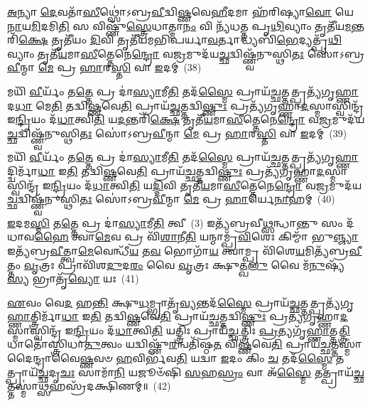 \-\ul{𑌅}\-𑌨𑍍𑌯𑌾 \ul{𑌦𑍇}\-𑌵𑌤𑌾᳴\-\ul{𑌸𑍀}\-𑌥𑍍𑌸𑍋॑\-𑌽𑌬𑍍𑌰\-\ul{𑌵𑍀}\-𑌦𑍍𑌵𑌿\-\ul{𑌷𑍍𑌣}\-𑌵𑍇\-\ul{𑌹𑍀}\-𑌦𑌮𑌾 𑌹᳴𑌰𑌿𑌷𑍍𑌯𑌾\-\ul{𑌵𑍋} 𑌯𑍇\-\ul{𑌨𑌾}\-𑌯\-\ul{𑌮𑌿}\-𑌦𑌮𑌿\-\ul{𑌤𑌿} 𑌸 𑌵𑌿𑌷𑍍𑌣𑍁᳴\-\ul{𑌸𑍍𑌤𑍍𑌰𑍇}\-𑌧𑌾𑌤𑍍𑌮𑌾\-\ul{𑌨𑌂} 𑌵𑌿 𑌨𑍍𑌯᳴𑌧𑌤𑍍𑌤 𑌪𑍃\-\ul{𑌥𑌿}\-𑌵𑍍𑌯𑌾𑌂 𑌤𑍃𑌤𑍀᳴𑌯\-\ul{𑌮}\-𑌨𑍍𑌤𑌰𑌿᳴\-\ul{𑌕𑍍𑌷𑍇} 𑌤𑍃𑌤𑍀᳴𑌯𑌂 \ul{𑌦𑌿}\-𑌵𑌿 𑌤𑍃𑌤𑍀᳴𑌯𑌮𑌭𑌿𑌪𑌰𑍍𑌯𑌾\-\ul{𑌵}\-𑌰𑍍𑌤𑌾𑌦𑍍𑌧𑍍𑌯𑌬𑌿᳴\-\ul{𑌭𑍇}\-𑌦𑍍𑌯𑌤𑍍𑌪𑍃᳴\-\ul{𑌥𑌿}\-𑌵𑍍𑌯𑌾𑌂 𑌤𑍃𑌤𑍀᳴\-\ul{𑌯}\-𑌮𑌾\-\ul{𑌸𑍀}\-𑌤𑍍𑌤𑍇𑌨𑍇\-\ul{𑌨𑍍𑌦𑍍𑌰𑍋} 𑌵\-\ul{𑌜𑍍𑌰}\-𑌮𑍁𑌦᳴𑌯\-\ul{𑌚𑍍𑌛}\-𑌦𑍍𑌵𑌿𑌷𑍍𑌣𑍍𑌵᳴𑌨𑍁𑌸𑍍𑌥𑌿\-\ul{𑌤𑌃} 𑌸𑍋॑\-𑌽𑌬𑍍𑌰\-\ul{𑌵𑍀}\-𑌨𑍍𑌮𑌾 \ul{𑌮𑍇} 𑌪𑍍𑌰 \ul{𑌹𑌾}\-𑌰\-\ul{𑌸𑍍𑌤𑌿} 𑌵𑌾 \ul{𑌇}\-𑌦𑌮𑍍~(38)

𑌮𑌯𑌿᳴ \ul{𑌵𑍀}\-𑌰𑍍𑌯𑌂᳴ 𑌤\-\ul{𑌤𑍍𑌤𑍇} 𑌪𑍍𑌰 𑌦𑌾॑\-\ul{𑌸𑍍𑌯𑌾}\-𑌮𑍀\-\ul{𑌤𑌿} 𑌤𑌦᳴\-\ul{𑌸𑍍𑌮𑍈} 𑌪𑍍𑌰𑌾𑌯᳴\-\ul{𑌚𑍍𑌛}\-𑌤𑍍𑌤𑌤𑍍𑌪𑍍𑌰𑌤𑍍𑌯᳴𑌗𑍃\-\ul{𑌹𑍍𑌣𑌾}\-𑌦\-\ul{𑌧𑌾} 𑌮𑍇\-\ul{𑌤𑌿} 𑌤𑌦𑍍𑌵𑌿\-\ul{𑌷𑍍𑌣}\-𑌵𑍇\-\ul{𑌤𑌿} 𑌪𑍍𑌰𑌾𑌯᳴\-\ul{𑌚𑍍𑌛}\-𑌤𑍍𑌤𑌦𑍍𑌵𑌿\-\ul{𑌷𑍍𑌣𑍁𑌃} 𑌪𑍍𑌰𑌤𑍍𑌯᳴𑌗𑍃𑌹𑍍𑌣𑌾\-\ul{𑌦}\-𑌸𑍍𑌮𑌾𑌸𑍍𑌵𑌿𑌨𑍍𑌦𑍍𑌰᳴ 𑌇\-\ul{𑌨𑍍𑌦𑍍𑌰𑌿}\-𑌯𑌂 𑌦᳴\-\ul{𑌧𑌾}\-𑌤𑍍𑌵𑌿\-\ul{𑌤𑌿} 𑌯\-\ul{𑌦}\-𑌨𑍍𑌤𑌰𑌿᳴\-\ul{𑌕𑍍𑌷𑍇} 𑌤𑍃𑌤𑍀᳴\-\ul{𑌯}\-𑌮𑌾\-\ul{𑌸𑍀}\-𑌤𑍍𑌤𑍇𑌨𑍇\-\ul{𑌨𑍍𑌦𑍍𑌰𑍋} 𑌵\-\ul{𑌜𑍍𑌰}\-𑌮𑍁𑌦᳴𑌯\-\ul{𑌚𑍍𑌛}\-𑌦𑍍𑌵𑌿𑌷𑍍𑌣𑍍𑌵᳴𑌨𑍁𑌸𑍍𑌥𑌿\-\ul{𑌤𑌃} 𑌸𑍋॑\-𑌽𑌬𑍍𑌰\-\ul{𑌵𑍀}\-𑌨𑍍𑌮𑌾 \ul{𑌮𑍇} 𑌪𑍍𑌰 \ul{𑌹𑌾}\-𑌰\-\ul{𑌸𑍍𑌤𑌿} 𑌵𑌾 \ul{𑌇}\-𑌦𑌮𑍍~(39)

𑌮𑌯𑌿᳴ \ul{𑌵𑍀}\-𑌰𑍍𑌯𑌂᳴ 𑌤\-\ul{𑌤𑍍𑌤𑍇} 𑌪𑍍𑌰 𑌦𑌾॑\-\ul{𑌸𑍍𑌯𑌾}\-𑌮𑍀\-\ul{𑌤𑌿} 𑌤𑌦᳴\-\ul{𑌸𑍍𑌮𑍈} 𑌪𑍍𑌰𑌾𑌯᳴\-\ul{𑌚𑍍𑌛}\-𑌤𑍍𑌤𑌤𑍍𑌪𑍍𑌰𑌤𑍍𑌯᳴𑌗𑍃\-\ul{𑌹𑍍𑌣𑌾}\-𑌦𑍍𑌦𑍍𑌵𑌿𑌰𑍍𑌮𑌾᳴\-\ul{𑌧𑌾} 𑌇\-\ul{𑌤𑌿} 𑌤𑌦𑍍𑌵𑌿\-\ul{𑌷𑍍𑌣}\-𑌵𑍇\-\ul{𑌤𑌿} 𑌪𑍍𑌰𑌾𑌯᳴\-\ul{𑌚𑍍𑌛}\-𑌤𑍍𑌤𑌦𑍍𑌵𑌿\-\ul{𑌷𑍍𑌣𑍁𑌃} 𑌪𑍍𑌰𑌤𑍍𑌯᳴𑌗𑍃𑌹𑍍𑌣𑌾\-\ul{𑌦}\-𑌸𑍍𑌮𑌾𑌸𑍍𑌵𑌿𑌨𑍍𑌦𑍍𑌰᳴ 𑌇\-\ul{𑌨𑍍𑌦𑍍𑌰𑌿}\-𑌯𑌂 𑌦᳴\-\ul{𑌧𑌾}\-𑌤𑍍𑌵𑌿\-\ul{𑌤𑌿} 𑌯\-\ul{𑌦𑍍𑌦𑌿}\-𑌵𑌿 𑌤𑍃𑌤𑍀᳴\-\ul{𑌯}\-𑌮𑌾\-\ul{𑌸𑍀}\-𑌤𑍍𑌤𑍇𑌨𑍇\-\ul{𑌨𑍍𑌦𑍍𑌰𑍋} 𑌵\-\ul{𑌜𑍍𑌰}\-𑌮𑍁𑌦᳴𑌯\-\ul{𑌚𑍍𑌛}\-𑌦𑍍𑌵𑌿𑌷𑍍𑌣𑍍𑌵᳴𑌨𑍁𑌸𑍍𑌥𑌿\-\ul{𑌤𑌃} 𑌸𑍋॑\-𑌽𑌬𑍍𑌰\-\ul{𑌵𑍀}\-𑌨𑍍𑌮𑌾 \ul{𑌮𑍇} 𑌪𑍍𑌰 \ul{𑌹𑌾}\-𑌰𑍍𑌯𑍇\-\ul{𑌨𑌾}\-𑌹𑌮𑍍~(40)

\-\ul{𑌇}\-𑌦𑌮\-\ul{𑌸𑍍𑌮𑌿} 𑌤\-\ul{𑌤𑍍𑌤𑍇} 𑌪𑍍𑌰 𑌦𑌾॑\-\ul{𑌸𑍍𑌯𑌾}\-𑌮𑍀\-\ul{𑌤𑌿} 𑌤𑍍𑌵𑍀~(3) 𑌇𑌤𑍍𑌯᳴𑌬𑍍𑌰𑌵𑍀\-\ul{𑌥𑍍𑌸}\-𑌨𑍍𑌧𑌾𑌨𑍍𑌤𑍁 𑌸𑌂 𑌦᳴𑌧𑌾𑌵\-\ul{𑌹𑍈} 𑌤𑍍𑌵𑌾\-\ul{𑌮𑍇}\-𑌵 𑌪𑍍𑌰 𑌵𑌿᳴\-\ul{𑌶𑌾}\-𑌨𑍀\-\ul{𑌤𑌿} 𑌯𑌨𑍍𑌮𑌾𑌮𑍍𑌪𑍍𑌰᳴\-\ul{𑌵𑌿}\-𑌶𑍇𑌃 𑌕𑌿𑌮𑍍𑌮𑌾᳴ 𑌭𑍁\-\ul{𑌞𑍍𑌜𑍍𑌯𑌾} 𑌇𑌤𑍍𑌯᳴𑌬𑍍𑌰\-\ul{𑌵𑍀}\-𑌤𑍍𑌤𑍍𑌵𑌾\-\ul{𑌮𑍇}\-𑌵𑍇𑌨𑍍𑌧𑍀᳴\-\ul{𑌯} 𑌤\-\ul{𑌵} 𑌭𑍋𑌗𑌾᳴\-\ul{𑌯} 𑌤𑍍𑌵𑌾𑌮𑍍𑌪𑍍𑌰 𑌵𑌿᳴𑌶𑍇\-\ul{𑌯}\-𑌮𑌿𑌤𑍍𑌯᳴𑌬𑍍𑌰\-\ul{𑌵𑍀}\-𑌤𑍍𑌤𑌂 \ul{𑌵𑍃}\-𑌤𑍍𑌰𑌃 𑌪𑍍𑌰𑌾𑌵𑌿᳴𑌶\-\ul{𑌦𑍁}\-𑌦\-\ul{𑌰𑌂} 𑌵𑍈 \ul{𑌵𑍃}\-𑌤𑍍𑌰𑌃 𑌕𑍍𑌷𑍁𑌤𑍍𑌖\-\ul{𑌲𑍁} 𑌵𑍈 𑌮᳴\-\ul{𑌨𑍁}\-𑌷𑍍𑌯᳴\-\ul{𑌸𑍍𑌯} 𑌭𑍍𑌰𑌾𑌤𑍃᳴\-\ul{𑌵𑍍𑌯𑍋} 𑌯𑌃~(41)

\-\ul{𑌏}\-𑌵𑌂 𑌵𑍇\-\ul{𑌦} 𑌹\-\ul{𑌨𑍍𑌤𑌿} 𑌕𑍍𑌷𑍁\-\ul{𑌧}\-𑌮𑍍𑌭𑍍𑌰𑌾𑌤𑍃᳴\-\ul{𑌵𑍍𑌯}\-𑌨𑍍𑌤𑌦᳴\-\ul{𑌸𑍍𑌮𑍈} 𑌪𑍍𑌰𑌾𑌯᳴\-\ul{𑌚𑍍𑌛}\-𑌤𑍍𑌤𑌤𑍍𑌪𑍍𑌰𑌤𑍍𑌯᳴𑌗𑍃\-\ul{𑌹𑍍𑌣𑌾}\-𑌤𑍍𑌤𑍍𑌰𑌿𑌰𑍍𑌮𑌾᳴\-\ul{𑌧𑌾} 𑌇\-\ul{𑌤𑌿} 𑌤𑌦𑍍𑌵𑌿\-\ul{𑌷𑍍𑌣}\-𑌵𑍇\-\ul{𑌤𑌿} 𑌪𑍍𑌰𑌾𑌯᳴\-\ul{𑌚𑍍𑌛}\-𑌤𑍍𑌤𑌦𑍍𑌵𑌿\-\ul{𑌷𑍍𑌣𑍁𑌃} 𑌪𑍍𑌰𑌤𑍍𑌯᳴𑌗𑍃𑌹𑍍𑌣𑌾\-\ul{𑌦}\-𑌸𑍍𑌮𑌾𑌸𑍍𑌵𑌿𑌨𑍍𑌦𑍍𑌰᳴ 𑌇\-\ul{𑌨𑍍𑌦𑍍𑌰𑌿}\-𑌯𑌂 𑌦᳴\-\ul{𑌧𑌾}\-𑌤𑍍𑌵𑌿\-\ul{𑌤𑌿} 𑌯𑌤𑍍𑌤𑍍𑌰𑌿𑌃 𑌪𑍍𑌰𑌾𑌯᳴\-\ul{𑌚𑍍𑌛}\-𑌤𑍍𑌤𑍍𑌰𑌿𑌃 \ul{𑌪𑍍𑌰}\-𑌤𑍍𑌯𑌗𑍃᳴\-\ul{𑌹𑍍𑌣𑌾}\-𑌤𑍍𑌤\-\ul{𑌤𑍍𑌤𑍍𑌰𑌿}\-𑌧𑌾𑌤𑍋॑𑌸𑍍𑌤𑍍𑌰𑌿𑌧𑌾\-\ul{𑌤𑍁}\-𑌤𑍍𑌵𑌂 𑌯𑌦𑍍𑌵𑌿𑌷𑍍𑌣𑍁᳴\-\ul{𑌰}\-𑌨𑍍𑌵𑌤𑌿᳴𑌷𑍍𑌠\-\ul{𑌤} 𑌵𑌿\-\ul{𑌷𑍍𑌣}\-𑌵𑍇\-\ul{𑌤𑌿} 𑌪𑍍𑌰𑌾𑌯᳴\-\ul{𑌚𑍍𑌛}\-𑌤𑍍𑌤𑌸𑍍𑌮𑌾᳴𑌦𑍈𑌨𑍍𑌦𑍍𑌰𑌾𑌵𑍈\-\ul{𑌷𑍍𑌣}\-𑌵𑍞 \ul{𑌹}\-𑌵𑌿𑌰𑍍𑌭᳴𑌵\-\ul{𑌤𑌿} 𑌯𑌦𑍍𑌵𑌾 \ul{𑌇}\-𑌦𑌂 𑌕𑌿𑌂 \ul{𑌚} 𑌤𑌦᳴\-\ul{𑌸𑍍𑌮𑍈} 𑌤𑌤𑍍𑌪𑍍𑌰𑌾𑌯᳴\-\ul{𑌚𑍍𑌛}\-𑌦𑍃\-\ul{𑌚𑌃} 𑌸𑌾𑌮𑌾᳴\-\ul{𑌨𑌿} 𑌯𑌜𑍂𑍞᳴𑌷𑌿 \ul{𑌸}\-𑌹\-\ul{𑌸𑍍𑌰𑌂} 𑌵𑌾 𑌅᳴\-\ul{𑌸𑍍𑌮𑍈} 𑌤𑌤𑍍𑌪𑍍𑌰𑌾𑌯᳴\-\ul{𑌚𑍍𑌛}\-𑌤𑍍𑌤𑌸𑍍𑌮𑌾॑\-\ul{𑌥𑍍𑌸}\-𑌹𑌸𑍍𑌰᳴𑌦𑌕𑍍𑌷𑌿𑌣𑌮𑍍॥~(42)

